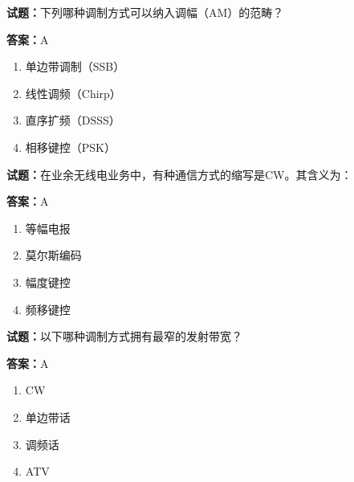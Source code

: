 \documentclass{ctexbook}
\begin{document}




\vspace{1em}

\textbf{试题：}下列哪种调制方式可以纳入调幅（AM）的范畴？ 

\textbf{答案：}A 

\begin{enumerate}[leftmargin=3em]
  \item 单边带调制（SSB） 

  \item 线性调频（Chirp） 

  \item 直序扩频（DSSS） 

  \item 相移键控（PSK） 

\end{enumerate}





\vspace{1em}

\textbf{试题：}在业余无线电业务中，有种通信方式的缩写是CW。其含义为： 

\textbf{答案：}A 

\begin{enumerate}[leftmargin=3em]
  \item 等幅电报 

  \item 莫尔斯编码 

  \item 幅度键控 

  \item 频移键控 


\end{enumerate}





\vspace{1em}

\textbf{试题：}以下哪种调制方式拥有最窄的发射带宽？ 

\textbf{答案：}A 

\begin{enumerate}[leftmargin=3em]
  \item CW 

  \item 单边带话 

  \item 调频话 

  \item ATV 

\end{enumerate}
\end{document}
